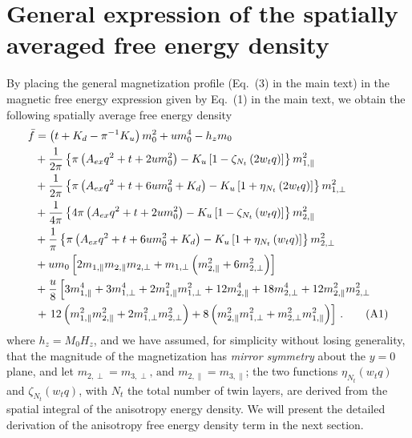 \documentclass[10pt,onecolumn,prb,aps,notitlepage]{revtex4}
\begin{document}
\section{General expression of the spatially averaged free energy density}
By placing the general magnetization profile (Eq.~(3) in the main text) in the magnetic free energy expression given by Eq.~(1) in the main text, we obtain the following spatially average free energy density
\begin{align}
\bar{f}& =\left( t+K_{d}-\pi ^{-1}K_{u}\right)
m_{0}^{2}+um_{0}^{4}-h_{z}m_{0}  \notag \\
& +\frac{1}{2\pi }\left\{ \pi \left( A_{ex}q^{2}+t+2um_{0}^{2}\right) -K_{u}%
\left[ 1-\zeta _{N_{t}}\left( 2w_{t}q\right) \right] \right\} m_{1,\parallel
}^{2}  \notag \\
& +\frac{1}{2\pi }\left\{ \pi \left( A_{ex}q^{2}+t+6um_{0}^{2}+K_{d}\right)
-K_{u}\left[ 1+\eta _{N_{t}}\left( 2w_{t}q\right) \right] \right\}
m_{1,\perp }^{2}  \notag \\
& +\frac{1}{4\pi }\left\{ 4\pi \left( A_{ex}q^{2}+t+2um_{0}^{2}\right) -K_{u}%
\left[ 1-\zeta _{N_{t}}\left( w_{t}q\right) \right] \right\} m_{2,\parallel
}^{2}  \notag \\
& +\frac{1}{\pi }\left\{ \pi \left( A_{ex}q^{2}+t+6um_{0}^{2}+K_{d}\right)
-K_{u}\left[ 1+\eta _{N_{t}}\left( w_{t}q\right) \right] \right\} m_{2,\perp
}^{2}  \notag \\
& +um_{0}\left[ 2m_{1,\parallel }m_{2,\parallel }m_{2,\perp }+m_{1,\perp
}\left( m_{2,\parallel }^{2}+6m_{2,\perp }^{2}\right) \right]  \notag \\
& +\frac{u}{8}\left[ 3m_{1,\parallel }^{4}+3m_{1,\perp }^{4}+2m_{1,\parallel
}^{2}m_{1,\perp }^{2}+12m_{2,\parallel }^{4}+18m_{2,\perp
}^{4}+12m_{2,\parallel }^{2}m_{2,\perp }^{2}\right.  \notag \\
& \left. +\text{ }12\left( m_{1,\parallel }^{2}m_{2,\parallel
}^{2}+2m_{1,\perp }^{2}m_{2,\perp }^{2}\right) +8\left( m_{2,\parallel
}^{2}m_{1,\perp }^{2}+m_{2,\perp }^{2}m_{1,\parallel }^{2}\right) \right] \,. \tag{A1}
\label{Eq:ave-f}
\end{align}%
where $h_{z}=M_{0}H_{z}$, and we have assumed, for simplicity without losing generality, that the
magnitude of the magnetization has \textit{mirror symmetry} about the $y=0$
plane, and let $
m_{2,\perp }=m_{3,\perp }\text{, and }m_{2,\parallel }=m_{3,\parallel }
$; the two functions $\eta _{N_{t}}\left( w_{t}q\right)$ and $\zeta _{N_{t}}\left( w_{t}q\right)$, with $N_{t}$ the total number of twin layers, are derived from the spatial integral of the anisotropy energy density. We will present the detailed derivation of the anisotropy free energy density term in the next section.
\end{document}

